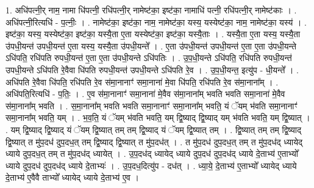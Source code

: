 \documentclass[17pt]{extarticle}
\begin{document}
1. अधि॑पत्नी॒र् नाम॒ नामा धि॑पत्नी॒ रधि॑पत्नी॒र् नामेष्ट॑का॒ इष्ट॑का॒ नामाधि॑ पत्नी॒ रधि॑पत्नी॒र् 
नामेष्ट॑काः । . अधि॑पत्नी॒रित्यधि॑ - प॒त्नीः॒ । . नामेष्ट॑का॒ इष्ट॑का॒ नाम॒ नामेष्ट॑का॒ यस्य॒ यस्येष्ट॑का॒ नाम॒ नामेष्ट॑का॒ यस्य॑ । . इष्ट॑का॒ यस्य॒ यस्येष्ट॑का॒ इष्ट॑का॒ यस्यै॒ता ए॒ता यस्येष्ट॑का॒ इष्ट॑का॒ यस्यै॒ताः । . यस्यै॒ता ए॒ता यस्य॒ यस्यै॒ता उ॑पधी॒यन्त॑ उपधी॒यन्त॑ ए॒ता यस्य॒ यस्यै॒ता उ॑पधी॒यन्ते᳚ । . ए॒ता उ॑पधी॒यन्त॑ उपधी॒यन्त॑ ए॒ता ए॒ता उ॑पधी॒यन्ते ऽधि॑पति॒ रधि॑पति रुपधी॒यन्त॑ ए॒ता ए॒ता उ॑पधी॒यन्ते ऽधि॑पतिः । . उ॒प॒धी॒यन्ते ऽधि॑पति॒ रधि॑पति रुपधी॒यन्त॑ उपधी॒यन्ते ऽधि॑पति रे॒वैवा धि॑पति रुपधी॒यन्त॑ उपधी॒यन्ते ऽधि॑पति रे॒व । . उ॒प॒धी॒यन्त॒ इत्यु॑प - धी॒यन्ते᳚ । . अधि॑पति रे॒वैवा धि॑पति॒ रधि॑पति रे॒व स॑मा॒नानाꣳ॑ समा॒नाना॑ मे॒वा धि॑पति॒ रधि॑पति रे॒व स॑मा॒नाना᳚म् । . अधि॑पति॒रित्यधि॑ - प॒तिः॒ । . ए॒व स॑मा॒नानाꣳ॑ समा॒नाना॑ मे॒वैव स॑मा॒नाना᳚म् भवति भवति समा॒नाना॑ मे॒वैव स॑मा॒नाना᳚म् भवति । . स॒मा॒नाना᳚म् भवति भवति समा॒नानाꣳ॑ समा॒नाना᳚म् भवति॒ यं ॅयम् भ॑वति समा॒नानाꣳ॑ समा॒नाना᳚म् भवति॒ यम् । . भ॒व॒ति॒ यं ॅयम् भ॑वति भवति॒ यम् द्वि॒ष्याद् द्वि॒ष्याद् यम् भ॑वति भवति॒ यम् द्वि॒ष्यात् । . यम् द्वि॒ष्याद् द्वि॒ष्याद् यं ॅयम् द्वि॒ष्यात् तम् तम् द्वि॒ष्याद् यं ॅयम् द्वि॒ष्यात् तम् । . द्वि॒ष्यात् तम् तम् द्वि॒ष्याद् द्वि॒ष्यात् त मु॑प॒दध॑ दुप॒दध॒त् तम् द्वि॒ष्याद् द्वि॒ष्यात् त मु॑प॒दध॑त् । . त मु॑प॒दध॑ दुप॒दध॒त् तम् त मु॑प॒दध॑द् ध्यायेद् ध्याये दुप॒दध॒त् तम् त मु॑प॒दध॑द् ध्यायेत् । . उ॒प॒दध॑द् ध्यायेद् ध्याये दुप॒दध॑ दुप॒दध॑द् ध्याये दे॒ताभ्य॑ ए॒ताभ्यो᳚ ध्याये दुप॒दध॑ दुप॒दध॑द् ध्याये दे॒ताभ्यः॑ । . उ॒प॒दध॒दित्यु॑प - दध॑त् । . ध्या॒ये॒ दे॒ताभ्य॑ ए॒ताभ्यो᳚ ध्यायेद् ध्याये दे॒ताभ्य॑ ए॒वैवै ताभ्यो᳚ ध्यायेद् ध्याये दे॒ताभ्य॑ ए॒व । \newline
\end{document}
